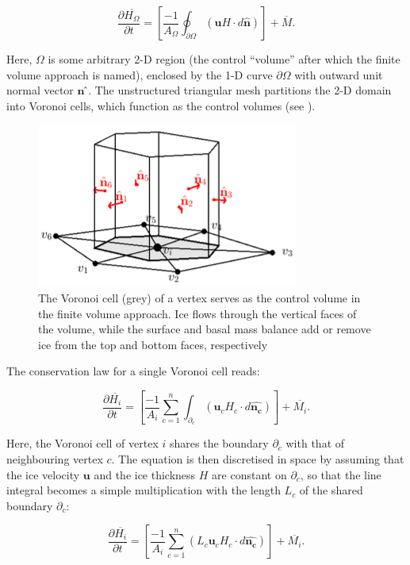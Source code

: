 \documentclass{article}
\begin{document}
\begin{equation}
\frac{\partial \overline{H_{\Omega}}}{\partial t} = \left[ \frac{-1}{A_{\Omega}} \oint_{\partial \Omega} \left( \mathbf{u}H \cdot d\mathbf{\hat{n}} \right) \right] + \overline{M}.
\end{equation}

Here, $\Omega$ is some arbitrary 2-D region (the control “volume” after which the finite volume approach is named), enclosed by the 1-D curve $\partial \Omega$ with outward unit normal vector $\textbf{\^{n}}$ ̂. The unstructured triangular mesh partitions the 2-D domain into Voronoi cells, which function as the control volumes (see ).

\begin{figure}[h!] \label{fig:masscontinuity}
  \includegraphics[width=0.3\linewidth]{Fig_masscontinuity.png}
  \caption{The Voronoi cell (grey) of a vertex serves as the control volume in the finite volume approach. Ice flows through the vertical faces of the volume, while the surface and basal mass balance add or remove ice from the top and bottom faces, respectively}
\end{figure}

The conservation law for a single Voronoi cell reads:

\begin{equation}
\frac{\partial \overline{H_i}}{\partial t} = \left[ \frac{-1}{A_i} \sum_{c=1}^n \int_{\partial_c} \left( \mathbf{u}_c H_c \cdot d\mathbf{\hat{n_c}} \right) \right] + \overline{M_i}.
\end{equation}

Here, the Voronoi cell of vertex $i$ shares the boundary $\partial_c$ with that of neighbouring vertex $c$. The equation is then discretised in space by assuming that the ice velocity $\textbf{u}$ and the ice thickness $H$ are constant on $\partial_c$, so that the line integral becomes a simple multiplication with the length $L_c$ of the shared boundary $\partial_c$:

\begin{equation}
\frac{\partial \overline{H_i}}{\partial t} = \left[ \frac{-1}{A_i} \sum_{c=1}^n \left( L_c \mathbf{u}_c H_c \cdot d\mathbf{\hat{n_c}} \right) \right] + \overline{M_i}.
\end{equation}
\end{document}
